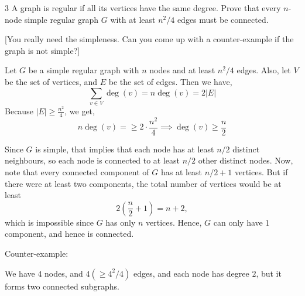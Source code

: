\documentclass[12pt]{article}
\begin{document}
\begin{problem}{3}
    A graph is regular if all its vertices have the same degree. Prove that every $n$-node simple regular graph $G$ with at least $n^2/4$ edges must be connected.
    
    [You really need the simpleness. Can you come up with a counter-example if the graph is not simple?]
\end{problem}

\begin{solution}
    \bbni 

    Let $G$ be a simple regular graph with $n$ nodes and at least $n^2/4$ edges. Also, let $V$ be the set of vertices, and $E$ be the set of edges.  
    Then we have, 
    \[\sum_{v \in V} \deg(v) = n \deg(v) = 2|E|\]
    Because $|E| \ge \frac{n^2}{4}$, we get,
    \[n\deg(v) = \ge 2 \cdot \frac{n^2}{4} \implies \deg(v) \ge \frac{n}{2}\]

    Since $G$ is simple, that implies that each node has at least $n/2$ distinct neighbours, so each node is connected to at least $n/2$ other distinct nodes.  
    Now, note that every connected component of $G$ has at least $n/2 + 1$ vertices. But if there were at least two components, the total number of vertices would be at least
    \[
        2\left(\frac{n}{2}+1\right) = n + 2,
    \]
    which is impossible since $G$ has only $n$ vertices. Hence, $G$ can only have $1$ component, and hence is connected.  

    Counter-example: 
    \begin{center}
    \end{center}
    We have $4$ nodes, and $4 (\geq 4^2 /4)$ edges, and each node has degree $2$, but it forms two connected subgraphs. 
\end{solution}
\end{document}
